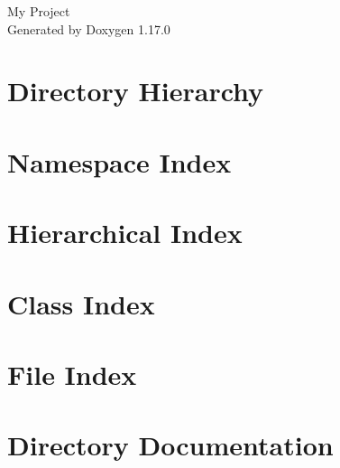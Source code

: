 \documentclass[twoside]{book}
\newcommand{\+}{\discretionary{\mbox{\scriptsize$\hookleftarrow$}}{}{}}
\newcommand{\clearemptydoublepage}{%
    \newpage{\pagestyle{empty}\cleardoublepage}%
  }
\begin{document}
  \raggedbottom
    \hypersetup{pageanchor=false,
                bookmarksnumbered=true,
                pdfencoding=unicode
               }
  \begin{titlepage}
  \vspace*{7cm}
  \begin{center}%
  {\Large My Project}\\
  \vspace*{1cm}
  {\large Generated by Doxygen 1.17.0}\\
  \end{center}
  \end{titlepage}
  \clearemptydoublepage
  \tableofcontents
  \clearemptydoublepage
  \hypersetup{pageanchor=true}
\chapter{Directory Hierarchy}

\chapter{Namespace Index}

\chapter{Hierarchical Index}

\chapter{Class Index}

\chapter{File Index}

\chapter{Directory Documentation}
























\end{document}
